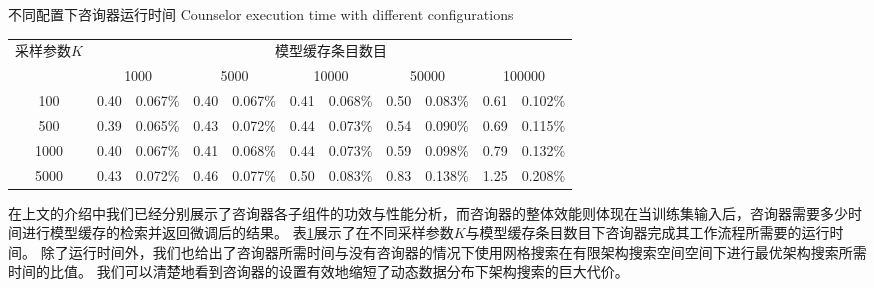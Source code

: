 \begin{table}[!hpb]
  \centering
  \bicaption[不同配置下咨询器运行时间]
    {不同配置下咨询器运行时间}
    {Counselor execution time with different configurations}
  \label{tab:counselor}
  \begin{tabular}{ccccccccccc}
    \toprule
    \multirow{2}{*}{采样参数$K$}  & \multicolumn{10}{c}{模型缓存条目数目}                                                                        \\ \cmidrule{2-11}
                                 & \multicolumn{2}{c}{1000}  & \multicolumn{2}{c}{5000}  & \multicolumn{2}{c}{10000}  & \multicolumn{2}{c}{50000}  & \multicolumn{2}{c}{100000}  \\ \midrule
    100           & 0.40  & 0.067\%  & 0.40  & 0.067\%  & 0.41  & 0.068\%  & 0.50  & 0.083\%  & 0.61  & 0.102\%  \\
    500           & 0.39  & 0.065\%  & 0.43  & 0.072\%  & 0.44  & 0.073\%  & 0.54  & 0.090\%  & 0.69  & 0.115\%  \\
    1000          & 0.40  & 0.067\%  & 0.41  & 0.068\%  & 0.44  & 0.073\%  & 0.59  & 0.098\%  & 0.79  & 0.132\%  \\
    5000          & 0.43  & 0.072\%  & 0.46  & 0.077\%  & 0.50  & 0.083\%  & 0.83  & 0.138\%  & 1.25  & 0.208\%  \\ \bottomrule
  \end{tabular}
\end{table}

在上文的介绍中我们已经分别展示了咨询器各子组件的功效与性能分析，而咨询器的整体效能则体现在当训练集输入后，咨询器需要多少时间进行模型缓存的检索并返回微调后的结果。
表\ref{tab:counselor}展示了在不同采样参数$K$与模型缓存条目数目下咨询器完成其工作流程所需要的运行时间。
除了运行时间外，我们也给出了咨询器所需时间与没有咨询器的情况下使用网格搜索在有限架构搜索空间空间下进行最优架构搜索所需时间的比值。
我们可以清楚地看到咨询器的设置有效地缩短了动态数据分布下架构搜索的巨大代价。

